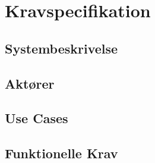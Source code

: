 
\chapter{Kravspecifikation}


\section{Systembeskrivelse}


\section{Aktører}


\newpage
\section{Use Cases}


\newpage
\section{Funktionelle Krav}


\newpage


